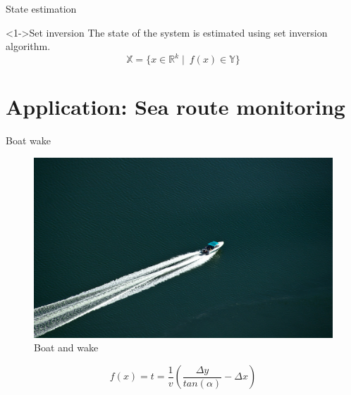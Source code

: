 \documentclass{beamer}
\begin{document}
        \begin{frame}{State estimation}
            \begin{block}<1->{Set inversion}
                The state of the system is estimated using set inversion algorithm.
                \begin{equation}
                    \mathbb{X} = \lbrace x \in \mathbb{R}^k \mid\ f(x) \in \mathbb{Y}\rbrace
                \end{equation}
            \end{block}
        \end{frame}

    \section{Application: Sea route monitoring}

        \begin{frame}{Boat wake}
            \begin{minipage}{0.45\textwidth}
                \begin{figure}
                    \centering
                    \includegraphics[width=\textwidth]{imgs/motorboat}
                    \caption{Boat and wake}
                \end{figure}
            \end{minipage}
            \hfill
            \begin{minipage}{0.5\textwidth}
                \begin{equation}
                    f(x) = t = \frac{1}{v} \left(\frac{\Delta y}{tan(\alpha)} - \Delta x\right)
                \end{equation}
            \end{minipage}
        \end{frame}
\end{document}
